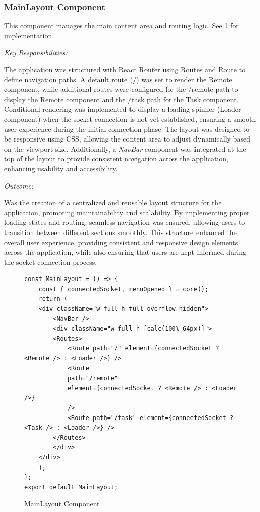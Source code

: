 \documentclass[a4paper,12pt]{extreport}
\begin{document}
\subsubsection{MainLayout Component}

This component manages the main content area and routing logic. See
\cref{judFig10} for implementation.

\emph{Key Responsibilities:}

The application was structured with React Router using Routes and Route
to define navigation paths. A default route (/) was set to render the
Remote component, while additional routes were configured for the
/remote path to display the Remote component and the /task path for the
Task component. Conditional rendering was implemented to display a
loading spinner (Loader component) when the socket connection is not yet
established, ensuring a smooth user experience during the initial
connection phase. The layout was designed to be responsive using CSS,
allowing the content area to adjust dynamically based on the viewport
size. Additionally, a \emph{NavBar} component was integrated at the top
of the layout to provide consistent navigation across the application,
enhancing usability and accessibility.

\emph{Outcome:}

Was the creation of a centralized and reusable layout structure for the
application, promoting maintainability and scalability. By implementing
proper loading states and routing, seamless navigation was ensured,
allowing users to transition between different sections smoothly. This
structure enhanced the overall user experience, providing consistent and
responsive design elements across the application, while also ensuring
that users are kept informed during the socket connection process.

\begin{figure}
\begin{verbatim}
const MainLayout = () => {
    const { connectedSocket, menuOpened } = core();
    return (
    <div className="w-full h-full overflow-hidden">
        <NavBar />
        <div className="w-full h-[calc(100%-64px)]">
        <Routes>
            <Route path="/" element={connectedSocket ? <Remote /> : <Loader />} />
            <Route
            path="/remote"
            element={connectedSocket ? <Remote /> : <Loader />}
            />
            <Route path="/task" element={connectedSocket ? <Task /> : <Loader />} />
        </Routes>
        </div>
    </div>
    );
};
export default MainLayout;
\end{verbatim}
\caption{MainLayout Component}
\label{judFig10}
\end{figure}
\end{document}
